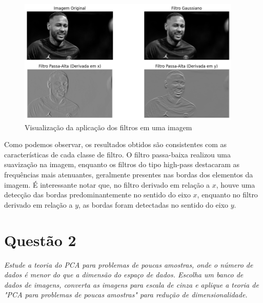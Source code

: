 \documentclass[a4paper, 11pt]{article}
\begin{document}
\begin{figure}[H]
    \centering 
    \includegraphics[width=0.95\textwidth]{imgs/ney.png}
    \caption{Visualização da aplicação dos filtros em uma imagem}
    \label{fig:ney} 
\end{figure}

Como podemos observar, os resultados obtidos são consistentes com as características de cada classe de filtro. O filtro passa-baixa realizou uma suavização na imagem, enquanto os filtros do tipo high-pass destacaram as frequências mais atenuantes, geralmente presentes nas bordas dos elementos da imagem. É interessante notar que, no filtro derivado em relação a $x$, houve uma detecção das bordas predominantemente no sentido do eixo $x$, enquanto no filtro derivado em relação a $y$, as bordas foram detectadas no sentido do eixo $y$.



\section{\textbf{Questão 2}}
\noindent \textit{Estude a teoria do PCA para problemas de poucas amostras, onde o número de dados é menor do que a dimensão do espaço de dados. Escolha um banco de dados de imagens, converta as imagens para escala de cinza e aplique a teoria de "PCA para problemas de poucas amostras" para redução de dimensionalidade.}
\end{document}
